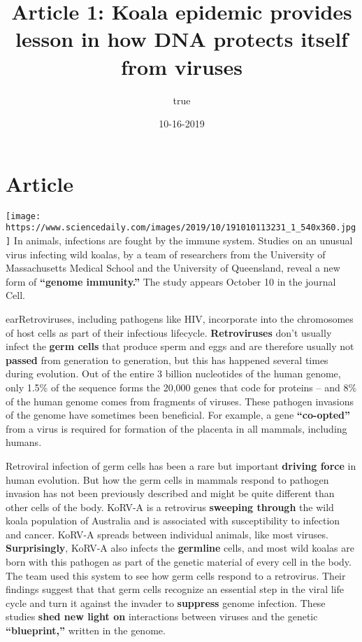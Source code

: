 \documentclass[]{article}
\title{Article 1: Koala epidemic provides lesson in how DNA protects itself
from viruses}
\author{true}
\date{10-16-2019}
\begin{document}
\maketitle

\hypertarget{article}{%
\section{Article}\label{article}}

\texttt{[image: https://www.sciencedaily.com/images/2019/10/191010113231\_1\_540x360.jpg]}
In animals, infections are fought by the immune system. Studies on an
unusual virus infecting wild koalas, by a team of researchers from the
University of Massachusetts Medical School and the University of
Queensland, reveal a new form of \textbf{``genome immunity.''} The study
appears October 10 in the journal Cell.

earRetroviruses, including pathogens like HIV, incorporate into the
chromosomes of host cells as part of their infectious lifecycle.
\textbf{Retroviruses} don't usually infect the \textbf{germ cells} that
produce sperm and eggs and are therefore usually not \textbf{passed}
from generation to generation, but this has happened several times
during evolution. Out of the entire 3 billion nucleotides of the human
genome, only 1.5\% of the sequence forms the 20,000 genes that code for
proteins -- and 8\% of the human genome comes from fragments of viruses.
These pathogen invasions of the genome have sometimes been beneficial.
For example, a gene \textbf{``co-opted''} from a virus is required for
formation of the placenta in all mammals, including humans.

Retroviral infection of germ cells has been a rare but important
\textbf{driving force} in human evolution. But how the germ cells in
mammals respond to pathogen invasion has not been previously described
and might be quite different than other cells of the body. KoRV-A is a
retrovirus \textbf{sweeping through} the wild koala population of
Australia and is associated with susceptibility to infection and cancer.
KoRV-A spreads between individual animals, like most viruses.
\textbf{Surprisingly}, KoRV-A also infects the \textbf{germline} cells,
and most wild koalas are born with this pathogen as part of the genetic
material of every cell in the body. The team used this system to see how
germ cells respond to a retrovirus. Their findings suggest that that
germ cells recognize an essential step in the viral life cycle and turn
it against the invader to \textbf{suppress} genome infection. These
studies \textbf{shed new light on} interactions between viruses and the
genetic \textbf{``blueprint,''} written in the genome.
\end{document}
